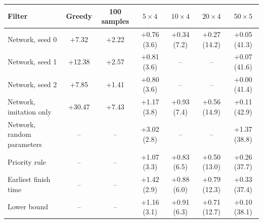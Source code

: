 \begin{tabular}{@{}lcccccc@{}}
\toprule
Filter & Greedy & 100 samples & $5 \times 4$ & $10 \times 4$ & $20 \times 4$ & $50 \times 5$ \\
\midrule
Network, seed 0 & +7.32 & +2.22 & +0.76 (3.6) & +0.34 (7.2) & +0.27 (14.2) & +0.05 (41.3) \\
Network, seed 1 & +12.38 & +2.57 & +0.81 (3.6) & -- & -- & +0.07 (41.6) \\
Network, seed 2 & +7.85 & +1.41 & +0.80 (3.6) & -- & -- & +0.00 (41.4) \\
Network, imitation only & +30.47 & +7.43 & +1.17 (3.8) & +0.93 (7.4) & +0.56 (14.9) & +0.11 (42.9) \\
Network, random parameters & -- & -- & +3.02 (2.8) & -- & -- & +1.37 (38.8) \\
\midrule
Priority rule & -- & -- & +1.07 (3.3) & +0.83 (6.5) & +0.50 (13.0) & +0.26 (37.7) \\
Earliest finish time & -- & -- & +1.42 (2.9) & +0.88 (6.0) & +0.79 (12.3) & +0.33 (37.4) \\
Lower bound & -- & -- & +1.16 (3.1) & +0.91 (6.3) & +0.71 (12.7) & +0.10 (38.1) \\
\bottomrule
\end{tabular}
